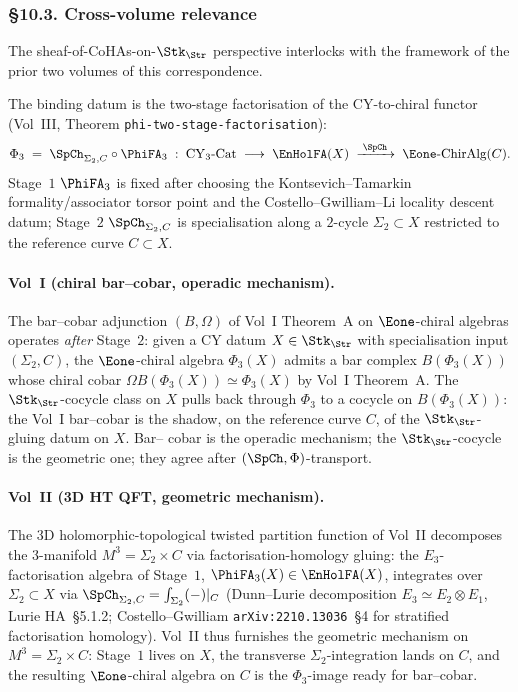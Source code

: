 \subsubsection{\S 10.3. Cross-volume relevance}
\label{gluing:sec:10-3-cross-volume}

The sheaf-of-CoHAs-on-$\Stk_{\Str}$ perspective interlocks with the
framework of the prior two volumes of this correspondence.

The binding datum is the two-stage factorisation of the
CY-to-chiral functor (Vol~III, \cite{VolI} Theorem
\texttt{phi-two-stage-factorisation}):
\[
\Phi_{3}
\;=\;
\SpCh_{\Sigma_{2},C}\circ\PhiFA_{3}
\;:\;
\mathrm{CY}_{3}\text{-Cat}\;\longrightarrow\;\EnHolFA(X)\;\xrightarrow{\;\SpCh\;}\;\Eone\text{-ChirAlg}(C).
\]
Stage~$1$ $\PhiFA_{3}$ is fixed after choosing the
Kontsevich--Tamarkin formality/associator torsor point and the
Costello--Gwilliam--Li locality descent datum;
Stage~$2$ $\SpCh_{\Sigma_{2},C}$ is specialisation along a $2$-cycle
$\Sigma_{2}\subset X$ restricted to the reference curve $C\subset X$.

\paragraph{Vol~I (chiral bar--cobar, operadic mechanism).} The
bar--cobar adjunction $(B,\Omega)$ of Vol~I Theorem~A on
$\Eone$-chiral algebras operates \emph{after} Stage~$2$: given a CY
datum $X\in\Stk_{\Str}$ with specialisation input $(\Sigma_{2},C)$,
the $\Eone$-chiral algebra $\Phi_{3}(X)$ admits a bar complex
$B(\Phi_{3}(X))$ whose chiral cobar $\Omega B(\Phi_{3}(X))\simeq
\Phi_{3}(X)$ by Vol~I Theorem~A. The $\Stk_{\Str}$-cocycle class on
$X$ pulls back through $\Phi_{3}$ to a cocycle on
$B(\Phi_{3}(X))$: the Vol~I bar--cobar is the shadow, on the
reference curve $C$, of the $\Stk_{\Str}$-gluing datum on $X$. Bar--
cobar is the operadic mechanism; the $\Stk_{\Str}$-cocycle is the
geometric one; they agree after $(\SpCh,\Phi)$-transport.

\paragraph{Vol~II (3D HT QFT, geometric mechanism).} The 3D
holomorphic-topological twisted partition function of Vol~II decomposes
the 3-manifold $M^{3}=\Sigma_{2}\times C$ via factorisation-homology
gluing: the $E_{3}$-factorisation algebra of Stage~$1$, $\PhiFA_{3}(X)
\in\EnHolFA(X)$, integrates over $\Sigma_{2}\subset X$ via
$\SpCh_{\Sigma_{2},C}=\int_{\Sigma_{2}}(-)|_{C}$ (Dunn--Lurie
decomposition $E_{3}\simeq E_{2}\otimes E_{1}$, Lurie HA~\S 5.1.2;
Costello--Gwilliam \texttt{arXiv:2210.13036}~\S 4 for stratified
factorisation homology). Vol~II thus furnishes the geometric mechanism
on $M^{3}=\Sigma_{2}\times C$: Stage~$1$ lives on $X$, the transverse
$\Sigma_{2}$-integration lands on $C$, and the resulting
$\Eone$-chiral algebra on $C$ is the $\Phi_{3}$-image ready for
bar--cobar.

